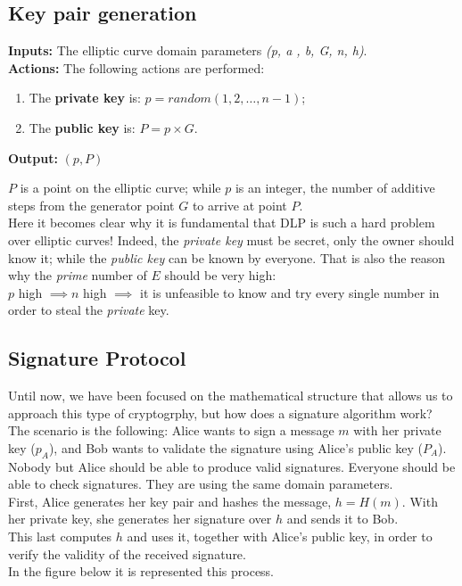 \subsection{Key pair generation}
\textbf{Inputs:} The elliptic curve domain parameters \textit{(p, a , b, G, n, h)}. \\
\textbf{Actions:} The following actions are performed:

\hspace{1.1cm}
\begin{minipage}[l]{2\linewidth}
	\begin{enumerate}
		\item The \textbf{private key} is: $p=random({1, 2, \dots, n-1})$;
		\item The \textbf{public key} is: $P=p\times G$.\\
	\end{enumerate}
\end{minipage}
\textbf{Output:} $(p,P)$

$P$ is a point on the elliptic curve; while $p$ is an integer, the number of additive steps from the generator point $G$ to arrive at point $P$. \\
Here it becomes clear why it is fundamental that DLP is such a hard problem over elliptic curves! Indeed, the \textit{private key} must be secret, only the owner should know it; while the \textit{public key} can be known by everyone. That is also the reason why the \textit{prime} number of $E$ should be very high:\\
$p$ high $\implies n$ high $\implies$ it is unfeasible to know and try every single number in order to steal the \textit{private} key.
\subsection{Signature Protocol}
Until now, we have been focused on the mathematical structure that allows us to approach this type of cryptogrphy, but how does a signature algorithm work?\\
The scenario is the following: Alice wants to sign a message $m$ with her private key ($p_{A}$), and Bob wants to validate the signature using Alice's public key ($P_{A}$). Nobody but Alice should be able to produce valid signatures. Everyone should be able to check signatures. They are using the same domain parameters.\\
First, Alice generates her key pair and hashes the message, $h=H(m)$. With her private key, she generates her signature over $h$ and sends it to Bob.\\
This last computes $h$ and uses it, together with Alice's public key, in order to verify the validity of the received signature.\\
In the figure below it is represented this process.\\

